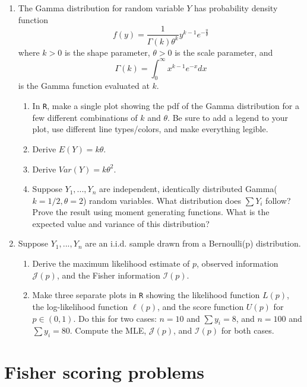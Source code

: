 \documentclass[11pt]{article}
\begin{document}
\begin{enumerate}
\item The Gamma distribution for random variable $Y$ has probability density function
\[
f(y) = \frac{1}{\Gamma(k)\theta^k}y^{k-1} e^{-\frac{y}{\theta}}
\]
where $k > 0$ is the shape parameter, $\theta > 0$ is the scale parameter, and 
\[
\Gamma(k) = \int_0^\infty x^{k-1} e^{-x} dx
\]
is the Gamma function evaluated at $k$.

\begin{enumerate}
\item In \texttt{R}, make a single plot showing the pdf of the Gamma distribution for a few different combinations of $k$ and $\theta$.  Be sure to add a legend to your plot, use different line types/colors, and make everything legible.

\item Derive $E(Y) = k \theta$.

\item Derive $Var(Y) = k \theta^2$.

\item Suppose $Y_1, ..., Y_n$ are independent, identically distributed Gamma($k=1/2, \theta=2$) random variables.  What distribution does $\sum Y_i$ follow?  Prove the result using moment generating functions.  What is the expected value and variance of this distribution?\\
\end{enumerate}

\item Suppose $Y_1, ..., Y_n$ are an i.i.d. sample drawn from a Bernoulli(p) distribution.

\begin{enumerate}
\item Derive the maximum likelihood estimate of $p$, observed information $\mathcal{J}(p)$, and the Fisher information $\mathcal{I}(p)$.
\item Make three separate plots in \texttt{R} showing the likelihood function $L(p)$, the log-likelihood function $\ell (p)$, and the score function $U(p)$ for $p \in (0,1)$.  Do this for two cases: $n=10$ and $\sum y_i = 8$, and $n=100$ and $\sum y_i = 80$.  Compute the MLE, $\mathcal{J}(p)$, and $\mathcal{I}(p)$ for both cases.
\end{enumerate}

\end{enumerate}

\newpage

\section*{Fisher scoring problems}
\end{document}
